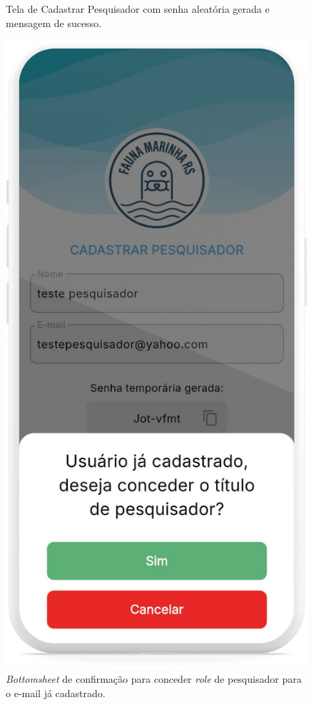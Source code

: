 \begin{figure}[H]
\begin{minipage}[t]{0.48\textwidth}
        \caption{Tela de Cadastrar Pesquisador com senha aleatória gerada e mensagem de sucesso.}
        \label{fig:cadastrarPesquisador-sucesso}
    \end{minipage}
    \hfill
    \begin{minipage}[t]{0.48\textwidth}
        \centering
        \includegraphics[height=0.72\textheight]{imagens/sistema/device_frame/cadastrarPesqJaExistente.png}
        \caption{\textit{Bottomsheet} de confirmação para conceder \textit{role} de pesquisador para o e-mail já cadastrado.}
        \label{fig:cadastrarPesquisador-ja-existente}
    \end{minipage}
\end{figure}

